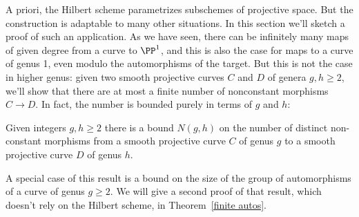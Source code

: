 A priori, the Hilbert scheme parametrizes subschemes of projective space. But the construction is adaptable to many other situations. In this section we'll sketch a proof of such an application. As we have seen, there can be infinitely many maps of given degree from a curve to $\PP^{1}$, and
this is also the case for maps to a curve of genus 1, even modulo the automorphisms of the target. But this is not
the case in higher genus: given two smooth projective curves $C$ and $D$ of genera $g, h \geq 2$, we'll show that there are at most a finite number of nonconstant morphisms $C \to D$. In fact, the number is bounded purely in terms of $g$ and $h$:

\begin{theorem}\label{bounded maps}
Given integers $g,h\geq 2$ there is a bound $N(g,h)$ on the number of distinct non-constant morphisms
from a smooth projective curve $C$ of genus $g$ to a smooth projective curve $D$ of genus $h$.
\end{theorem}

A special case of this result is a bound on the size of the group of automorphisms of a curve of genus $g\geq 2$. We will give a second proof of that result, which doesn't rely on the Hilbert scheme, in Theorem~\ref{finite autos}.

